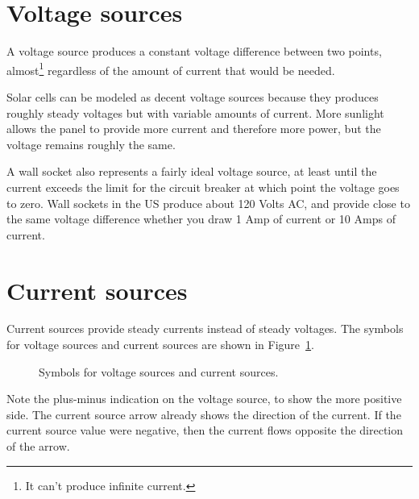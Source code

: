 \section{Voltage sources}
A voltage source produces a constant voltage difference between two points, almost\footnote{It can't produce infinite current.} regardless of the amount of current that would be needed.
\par
Solar cells can be modeled as decent voltage sources because they produces roughly steady voltages but with variable amounts of current. More sunlight allows the panel to provide more current and therefore more power, but the voltage remains roughly the same.
\par
A wall socket also represents a fairly ideal voltage source, at least until the current exceeds the limit for the circuit breaker at which point the voltage goes to zero. Wall sockets in the US produce about 120 Volts AC, and provide close to the same voltage difference whether you draw 1 Amp of current or 10 Amps of current. 

\par
\section{Current sources}
Current sources provide steady currents instead of steady voltages. The symbols for voltage sources and current sources are shown in Figure~\ref{F:2SCV}.
\par

\begin{figure}[H]
\begin{center}
\caption{Symbols for voltage sources and current sources.}
\label{F:2SCV}
\end{center}
\end{figure}

Note the plus-minus indication on the voltage source, to show the more positive side. The current source arrow already shows the direction of the current. If the current source value were negative, then the current flows opposite the direction of the arrow.

